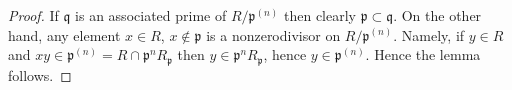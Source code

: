 \documentclass[10pt,a4paper]{amsart}
\theoremstyle{plain}
\theoremstyle{definition}
\theoremstyle{remark}
\numberwithin{equation}{subsection}
\begin{document}
\begin{proof}
If $\mathfrak q$ is an associated prime of $R/\mathfrak p^{(n)}$
then clearly $\mathfrak p \subset \mathfrak q$.
On the other hand, any element $x \in R$, $x \not \in \mathfrak p$
is a nonzerodivisor on $R/\mathfrak p^{(n)}$.
Namely, if $y \in R$ and
$xy \in \mathfrak p^{(n)} = R \cap \mathfrak p^nR_{\mathfrak p}$
then $y \in \mathfrak p^nR_{\mathfrak p}$, hence $y \in \mathfrak p^{(n)}$.
Hence the lemma follows.
\end{proof}
\end{document}
